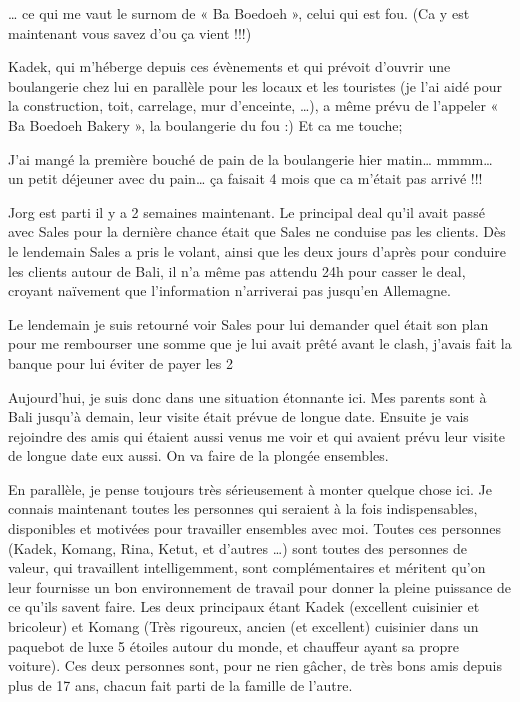 \par
… ce qui me vaut le surnom de « Ba Boedoeh », celui qui est fou. (Ca y est maintenant vous savez d’ou ça vient !!!)

\par
Kadek, qui m’héberge depuis ces évènements et qui prévoit d’ouvrir une boulangerie chez lui en parallèle pour les locaux et les touristes (je l’ai aidé pour la construction, toit, carrelage, mur d’enceinte, …), a même prévu de l’appeler « Ba Boedoeh Bakery », la boulangerie du fou :) Et ca me touche;

\par
J’ai mangé la première bouché de pain de la boulangerie hier matin… mmmm… un petit déjeuner avec du pain… ça faisait 4 mois que ca m’était pas arrivé !!!

\par
Jorg est parti il y a 2 semaines maintenant. Le principal deal qu’il avait passé avec Sales pour la dernière chance était que Sales ne conduise pas les clients. Dès le lendemain Sales a pris le volant, ainsi que les deux jours d’après pour conduire les clients autour de Bali, il n’a même pas attendu 24h pour casser le deal, croyant naïvement que l’information n’arriverai pas jusqu’en Allemagne.

\par
Le lendemain je suis retourné voir Sales pour lui demander quel était son plan pour me rembourser une somme que je lui avait prêté avant le clash, j’avais fait la banque pour lui éviter de payer les 2%

\par
Aujourd’hui, je suis donc dans une situation étonnante ici. Mes parents sont à Bali jusqu’à demain, leur visite était prévue de longue date. Ensuite je vais rejoindre des amis qui étaient aussi venus me voir et qui avaient prévu leur visite de longue date eux aussi. On va faire de la plongée ensembles.

\par
En parallèle, je pense toujours très sérieusement à monter quelque chose ici. Je connais maintenant toutes les personnes qui seraient à la fois indispensables, disponibles et motivées pour travailler ensembles avec moi. Toutes ces personnes (Kadek, Komang, Rina, Ketut, et d’autres …) sont toutes des personnes de valeur, qui travaillent intelligemment, sont complémentaires et méritent qu’on leur fournisse un bon environnement de travail pour donner la pleine puissance de ce qu’ils savent faire. Les deux principaux étant Kadek (excellent cuisinier et bricoleur) et Komang (Très rigoureux, ancien (et excellent) cuisinier dans un paquebot de luxe 5 étoiles autour du monde, et chauffeur ayant sa propre voiture). Ces deux personnes sont, pour ne rien gâcher, de très bons amis depuis plus de 17 ans, chacun fait parti de la famille de l’autre.

